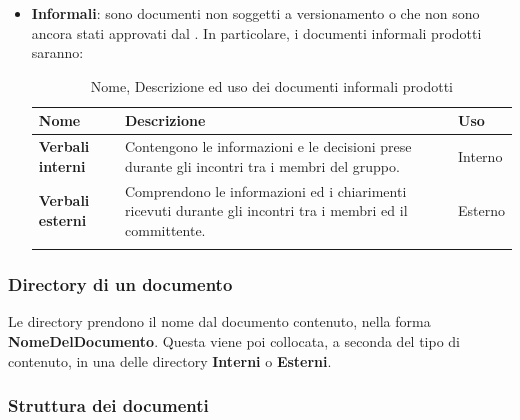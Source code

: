 {\begin{itemize}
\item \textbf{Informali}: sono documenti non soggetti a versionamento o che non sono ancora stati approvati dal \RdP{}. \newline 
In particolare, i documenti informali prodotti saranno:
{
	\setlength{\freewidth}{\dimexpr\textwidth-1\tabcolsep}
	\renewcommand{\arraystretch}{1.5}
	\setlength{\aboverulesep}{0pt}
	\setlength{\belowrulesep}{0pt}
	\begin{longtable}{L{.210\freewidth} L{.6\freewidth} L{.080\freewidth}}
		\toprule 
		\textbf{Nome} & \textbf{Descrizione} & \textbf{Uso}\\
		\toprule
		\endhead		
		\textbf{Verbali interni} & Contengono le informazioni e le decisioni prese durante gli incontri tra i membri del gruppo. & Interno \\ 
		\textbf{Verbali esterni} & Comprendono le informazioni ed i chiarimenti ricevuti durante gli incontri tra i membri ed il committente. & Esterno \\
		\bottomrule
		\hiderowcolors
		\caption{Nome, Descrizione ed uso dei documenti informali prodotti}
	\end{longtable}
}
\end{itemize}
\subsubsection{Directory di un documento}
Le directory prendono il nome dal documento contenuto, nella forma \textbf{NomeDelDocumento}. Questa viene poi collocata, a seconda del tipo di contenuto, in una delle directory \textbf{Interni} o \textbf{Esterni}. 
\subsubsection{Struttura dei documenti}
}
